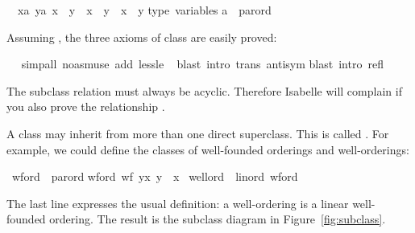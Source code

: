 \begin{isabellebody}
\begin{isamarkuptxt}
\begin{isabelle}
\ {}{\isachardot}\ {\isasymAnd}{\isacharparenleft}x{\isasymColon}{\isacharprime}a{\isacharparenright}\ y{\isasymColon}{\isacharprime}a{\isachardot}\ {\isacharparenleft}x\ {\isacharless}{\isacharless}{\isacharequal}\ y{\isacharparenright}\ {\isacharequal}\ {\isacharparenleft}x\ {\isacharless}{\isacharless}\ y\ {\isasymor}\ x\ {\isacharequal}\ y{\isacharparenright}\isanewline
type\ variables{\isacharcolon}\isanewline
\isaindent{\ \ }{\isacharprime}a\ {\isacharcolon}{\isacharcolon}\ parord%
\end{isabelle}
Assuming , the three axioms of class 
are easily proved:%
\end{isamarkuptxt}%
\isamarkuptrue%
\ \ \isamarkupfalse%
{\isacharparenleft}simp{\isacharunderscore}all\ {\isacharparenleft}no{\isacharunderscore}asm{\isacharunderscore}use{\isacharparenright}\ add{\isacharcolon}\ less{\isacharunderscore}le{\isacharparenright}\isanewline
\ \isamarkupfalse%
{\isacharparenleft}blast\ intro{\isacharcolon}\ trans\ antisym{\isacharparenright}\isanewline
{}\isamarkupfalse%
{\isacharparenleft}blast\ intro{\isacharcolon}\ refl{\isacharparenright}\isanewline
{}\isamarkupfalse%
%
\endisatagproof
{\isafoldproof}%
%
\isadelimproof
%
\endisadelimproof
%
\begin{isamarkuptext}%
The subclass relation must always be acyclic. Therefore Isabelle will
complain if you also prove the relationship .%
\end{isamarkuptext}%
\isamarkuptrue%
%
\isamarkuptrue%
%
\begin{isamarkuptext}%
A class may inherit from more than one direct superclass. This is called
.  For example, we could define
the classes of well-founded orderings and well-orderings:%
\end{isamarkuptext}%
\isamarkuptrue%
\isamarkupfalse%
\ wford\ {\isacharless}\ parord\isanewline
wford{\isacharcolon}\ {\isachardoublequoteopen}wf\ {\isacharbraceleft}{\isacharparenleft}y{\isacharcomma}x{\isacharparenright}{\isachardot}\ y\ {\isacharless}{\isacharless}\ x{\isacharbraceright}{\isachardoublequoteclose}\isanewline
\isanewline
{}\isamarkupfalse%
\ wellord\ {\isacharless}\ linord{\isacharcomma}\ wford%
\begin{isamarkuptext}%
\noindent
The last line expresses the usual definition: a well-ordering is a linear
well-founded ordering. The result is the subclass diagram in
Figure~\ref{fig:subclass}.


\end{isamarkuptext}
\end{isabellebody}
